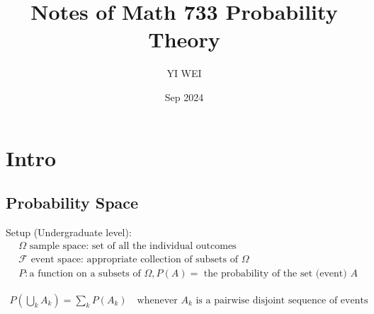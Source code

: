 \documentclass[11pt]{article}
\title{Notes of Math 733 Probability Theory}
\author{YI WEI}
\date{Sep 2024}
\begin{document}
\maketitle
\tableofcontents



\section{Intro}

\subsection{Probability Space}

Setup (Undergraduate level):
\begin{align*}
    &\Omega \text{ sample space: set of all the individual outcomes} \\
    &\mathcal{F}\text{ event space: appropriate collection of subsets of } \Omega\\
    &P: \text{a function on a subsets of } \Omega, P(A)= \text{ the probability of the set (event) }A 
\end{align*}

\begin{axiom}
    \begin{align*}
        P(\bigcup_k A_k) = \sum_{k} P(A_k) \quad \text{whenever } {A_k} \text{ is a pairwise disjoint sequence of events} 
    \end{align*}
\end{axiom}
\end{document}
